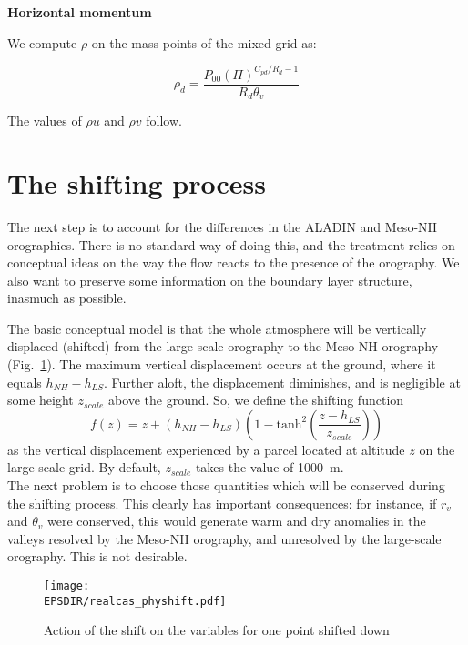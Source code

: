 {\bf Horizontal momentum}

We compute $\rho$ on the mass points of the mixed grid as:

\begin{equation}
\label{eq:rhod}
{\rho_d}=\frac{P_{00}(\Pi)^{C_{pd}/R_d -1}}
{R_d\theta_v}
\end{equation}

The values of $\rho u$ and $\rho v$ follow.

\section{The shifting process}

The next step is to account for the differences in the ALADIN and Meso-NH
orographies. There is no standard way of doing this, and the treatment
relies on conceptual ideas on the way the flow reacts to the presence of
the orography. We also want to preserve some information on the boundary
layer structure, inasmuch as possible.

The basic conceptual model is that the whole atmosphere will be vertically
displaced (shifted) from the large-scale orography to the Meso-NH orography
(Fig.~\ref{physhift}). The maximum vertical
displacement occurs at the ground, where it equals $h_{NH}-h_{LS}$. Further
aloft, the displacement diminishes, and is negligible at some height
$z_{scale}$ above the ground. So, we define the shifting function
\begin{equation}
\label{shift}
f(z)=z+(h_{NH}-h_{LS})\left( 1-\mbox{tanh}^2
\left(\frac{z-h_{LS}}{z_{scale}}\right)\right)
\end{equation}
as the vertical displacement experienced by a parcel located at altitude
$z$ on the large-scale grid.
By default, $z_{scale}$ takes the value of 1000~m.\\

The next problem is to choose those quantities which will be conserved
during the shifting process. This clearly has important consequences: for
instance, if $r_v$ and $\theta_v$ were conserved, this would generate
warm and dry anomalies in the valleys resolved by the Meso-NH orography,
and unresolved by the large-scale orography. This is not desirable.

\clearpage


\begin{figure}[!ht]
\centerline{\texttt{[image: \\EPSDIR/realcas\_physhift.pdf]}}
\caption{Action of the shift on the variables for one point shifted down
\label{physhift}}
\end{figure}

